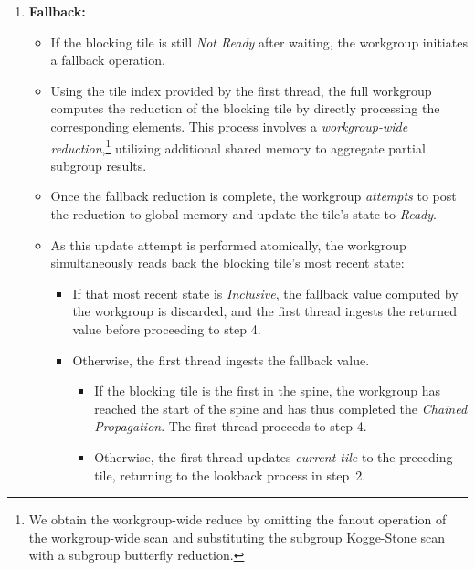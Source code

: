 \documentclass[sigconf,screen]{acmart}
\begin{document}
\begin{enumerate}
  \item \textbf{Fallback:}
        \begin{itemize}
          \item If the blocking tile is still \emph{Not Ready} after waiting, the workgroup initiates a fallback operation.
          \item Using the tile index provided by the first thread, the full workgroup computes the reduction of the blocking tile by directly processing the corresponding elements. This process involves a \emph{workgroup-wide reduction},\footnote{We obtain the workgroup-wide reduce by omitting the fanout operation of the workgroup-wide scan and substituting the subgroup Kogge-Stone scan with a subgroup butterfly reduction.} utilizing additional shared memory to aggregate partial subgroup results.
          \item Once the fallback reduction is complete, the workgroup \emph{attempts} to post the reduction to global memory and update the tile's state to \emph{Ready}.
          \item As this update attempt is performed atomically, the workgroup simultaneously reads back the blocking tile's most recent state:
                \begin{itemize}
                  \item If that most recent state is \emph{Inclusive}, the fallback value computed by the workgroup is discarded, and the first thread ingests the returned value before proceeding to step 4.
                  \item Otherwise, the first thread ingests the fallback value.
                        \begin{itemize}
                          \item If the blocking tile is the first in the spine, the workgroup has reached the start of the spine and has thus completed the \emph{Chained Propagation}. The first thread proceeds to step 4.
                          \item Otherwise, the first thread updates \emph{current tile} to the preceding tile, returning to the lookback process in step~2.
                        \end{itemize}
                \end{itemize}
        \end{itemize}


\end{enumerate}
\end{document}
